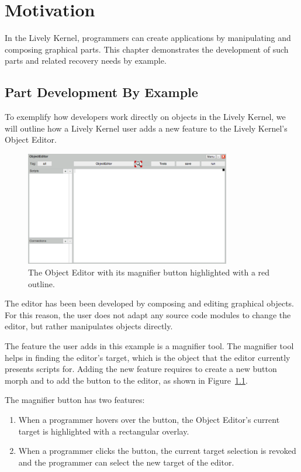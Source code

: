 \chapter{Motivation} \label{chapter:MOTIVATION}

In the Lively Kernel, programmers can create applications by manipulating and composing graphical parts.
This chapter demonstrates the development of such parts and related recovery needs by example.


\section{Part Development By Example}

To exemplify how developers work directly on objects in the Lively Kernel, we will outline how a Lively Kernel user adds a new feature to the Lively Kernel's Object Editor.

\begin{figure}[h]
    \centering
    \includegraphics[width=0.8\textwidth]{figures/3_motivation/1_magnifierButton.png}
    \caption{The Object Editor with its magnifier button highlighted with a red outline.}
    \label{fig:MagnifierButton}
\end{figure}

The editor has been been developed by composing and editing graphical objects.
For this reason, the user does not adapt any source code modules to change the editor, but rather manipulates objects directly.

The feature the user adds in this example is a magnifier tool.
The magnifier tool helps in finding the editor's target, which is the object that the editor currently presents scripts for.
Adding the new feature requires to create a new button morph and to add the button to the editor, as shown in Figure~\ref{fig:MagnifierButton}.

The magnifier button has two features:
\begin{enumerate}
    \item When a programmer hovers over the button, the Object Editor's current target is highlighted with a rectangular overlay.
    \item When a programmer clicks the button, the current target selection is revoked and the programmer can select the new target of the editor.
\end{enumerate}

